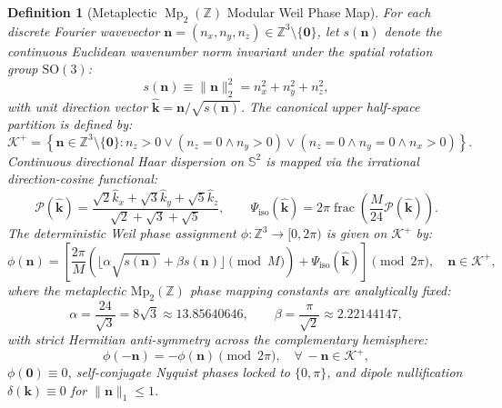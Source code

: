 \documentclass[11pt,letterpaper]{article}
\theoremstyle{plain}
\newtheorem{definition}{Definition}
\begin{document}
\begin{definition}[Metaplectic $\operatorname{Mp}_2(\mathbb{Z})$ Modular Weil Phase Map]
\label{def:metaplectic_phase_map}
For each discrete Fourier wavevector $\mathbf{n} = (n_x, n_y, n_z) \in \mathbb{Z}^3 \setminus \{\mathbf{0}\}$, let $s(\mathbf{n})$ denote the continuous Euclidean wavenumber norm invariant under the spatial rotation group $\mathrm{SO}(3)$:
\begin{equation}
s(\mathbf{n}) \equiv \|\mathbf{n}\|_2^2 = n_x^2 + n_y^2 + n_z^2,
\label{eq:euclidean_norm}
\end{equation}
with unit direction vector $\hat{\mathbf{k}} = \mathbf{n}/\sqrt{s(\mathbf{n})}$. The canonical upper half-space partition is defined by:
\begin{equation}
\mathcal{K}^+ = \left\{ \mathbf{n} \in \mathbb{Z}^3 \setminus \{\mathbf{0}\} : n_z > 0 \lor (n_z = 0 \land n_y > 0) \lor (n_z = 0 \land n_y = 0 \land n_x > 0) \right\}.
\end{equation}
Continuous directional Haar dispersion on $\mathbb{S}^2$ is mapped via the irrational direction-cosine functional:
\begin{equation}
\mathcal{P}(\hat{\mathbf{k}}) = \frac{\sqrt{2}\hat{k}_x + \sqrt{3}\hat{k}_y + \sqrt{5}\hat{k}_z}{\sqrt{2} + \sqrt{3} + \sqrt{5}}, \qquad \Psi_{\mathrm{iso}}(\hat{\mathbf{k}}) = 2\pi \operatorname{frac}\left( \frac{M}{24} \mathcal{P}(\hat{\mathbf{k}}) \right).
\end{equation}
The deterministic Weil phase assignment $\phi: \mathbb{Z}^3 \to [0, 2\pi)$ is given on $\mathcal{K}^+$ by:
\begin{equation}
\phi(\mathbf{n}) = \left[ \frac{2\pi}{M} \left( \lfloor \alpha \sqrt{s(\mathbf{n})} + \beta s(\mathbf{n}) \rfloor \pmod M \right) + \Psi_{\mathrm{iso}}(\hat{\mathbf{k}}) \right] \pmod{2\pi}, \quad \mathbf{n} \in \mathcal{K}^+,
\label{eq:weil_phase_map}
\end{equation}
where the metaplectic $\mathrm{Mp}_2(\mathbb{Z})$ phase mapping constants are analytically fixed:
\begin{equation}
\alpha = \frac{24}{\sqrt{3}} = 8\sqrt{3} \approx 13.85640646, \qquad \beta = \frac{\pi}{\sqrt{2}} \approx 2.22144147,
\end{equation}
with strict Hermitian anti-symmetry across the complementary hemisphere:
\begin{equation}
\phi(-\mathbf{n}) = -\phi(\mathbf{n}) \pmod{2\pi}, \quad \forall \, -\mathbf{n} \in \mathcal{K}^+,
\label{eq:hermitian_condition}
\end{equation}
$\phi(\mathbf{0}) \equiv 0$, self-conjugate Nyquist phases locked to $\{0, \pi\}$, and dipole nullification $\delta(\mathbf{k}) \equiv 0$ for $\|\mathbf{n}\|_1 \le 1$.
\end{definition}
\end{document}
